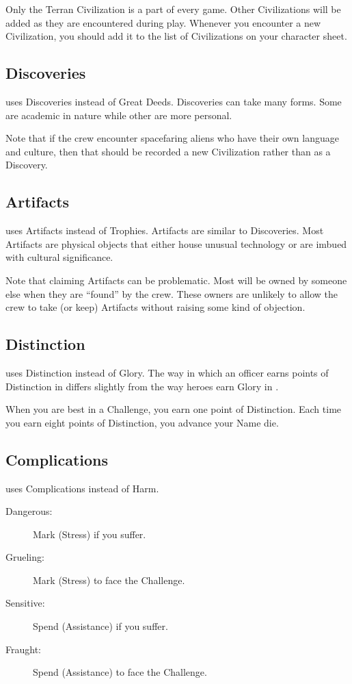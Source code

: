 \documentclass[11pt, a5paper, parskip=half-, DIV=12]{scrartcl}
\begin{document}
Only the Terran Civilization is a part of every game. Other Civilizations will be added as they are encountered during play. Whenever you encounter a new Civilization, you should add it to the list of Civilizations on your character sheet.

\subsection*{Discoveries}
\ENDEAVOUR{} uses Discoveries instead of Great Deeds. Discoveries can take many forms.  Some are academic in nature while other are more personal.

Note that if the crew encounter spacefaring aliens who have their own language and culture, then that should be recorded a new Civilization rather than as a Discovery.

\subsection*{Artifacts}
\ENDEAVOUR{} uses Artifacts instead of Trophies. Artifacts are similar to Discoveries. Most Artifacts are physical objects that either house unusual technology or are imbued with cultural significance.

Note that claiming Artifacts can be problematic. Most will be owned by someone else when they are ``found'' by the crew.  These owners are unlikely to allow the crew to take (or keep) Artifacts without raising some kind of objection.

\newpage

\subsection*{Distinction}
\ENDEAVOUR{} uses Distinction instead of Glory. The way in which an officer earns points of Distinction in \ENDEAVOUR{} differs slightly from the way heroes earn Glory in \AGON{}.

When you are best in a Challenge, you earn one point of Distinction. Each time you earn eight points of Distinction, you advance your Name die.

\subsection*{Complications}
\ENDEAVOUR{} uses Complications instead of Harm.
\begin{description}
	\item[Dangerous:] Mark  (Stress) if you suffer.
	\item[Grueling:] Mark  (Stress) to face the Challenge.
	\item[Sensitive:] Spend  (Assistance) if you suffer.
	\item[Fraught:] Spend  (Assistance) to face the Challenge.
\end{description}
\end{document}
